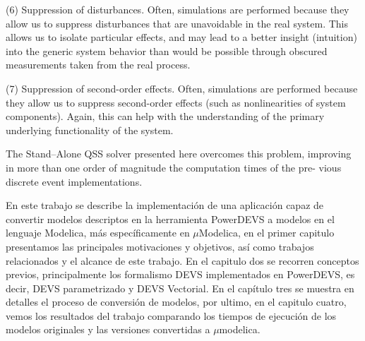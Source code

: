 (6) Suppression of disturbances. Often, simulations are performed because they allow us to suppress disturbances that are unavoidable in the real system. This allows us to isolate particular effects, and may lead to a better insight (intuition) into the generic system behavior than would be possible through obscured measurements taken from the real process.

(7) Suppression of second-order effects. Often, simulations are performed because they allow us to suppress second-order effects (such as nonlinearities of system components). Again, this can help with the understanding of the primary underlying functionality of the system.


The Stand–Alone QSS solver presented here overcomes this problem, improving in more than one order of magnitude the computation times of the pre- vious discrete event implementations.
















En este trabajo se describe la implementación de una aplicación capaz de convertir modelos descriptos en la herramienta PowerDEVS\cite{BK11} a modelos en el lenguaje Modelica\cite{Fritzson02modelica--}, más específicamente en $\mu$Modelica\cite{Ber12}, en el primer capitulo presentamos las principales motivaciones y objetivos, así como trabajos relacionados y el alcance de este trabajo. En el capitulo dos se recorren conceptos previos, principalmente los formalismo DEVS implementados en PowerDEVS, es decir, DEVS parametrizado y DEVS Vectorial. En el capítulo tres se muestra en detalles el proceso de conversión de modelos, por ultimo, en el capitulo cuatro, vemos los resultados del trabajo comparando los tiempos de ejecución de los modelos originales y las versiones convertidas a $\mu$modelica.


